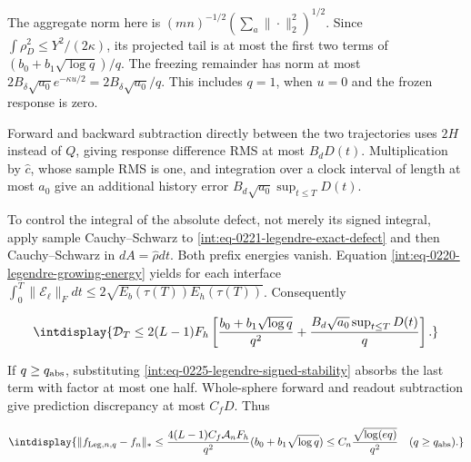 
The aggregate norm here is \((mn)^{-1/2}(\sum_a\|\cdot\|_2^2)^{1/2}\). Since \(\int\rho_D^2\le Y^2/(2\kappa)\), its projected tail is at most the first two terms of \((b_0+b_1\sqrt{\log q})/q\). The freezing remainder has norm at most \(2B_\delta\sqrt{a_0}e^{-\kappa u/2} =2B_\delta\sqrt{a_0}/q\). This includes \(q=1\), when \(u=0\) and the frozen response is zero.



Forward and backward subtraction directly between the two trajectories uses \(2H\) instead of \(Q\), giving response difference RMS at most \(B_dD(t)\). Multiplication by \(\widehat c\), whose sample RMS is one, and integration over a clock interval of length at most \(a_0\) give an additional history error \(B_d\sqrt{a_0}\sup_{t\le T}D(t)\).



To control the integral of the absolute defect, not merely its signed integral, apply sample Cauchy--Schwarz to \eqref{int:eq-0221-legendre-exact-defect} and then Cauchy--Schwarz in \(dA=\widehat\rho dt\). Both prefix energies vanish. Equation \eqref{int:eq-0220-legendre-growing-energy} yields for each interface \(\int_0^T\|\mathcal E_\ell\|_Fdt \le2\sqrt{E_b(\tau(T))E_h(\tau(T))}\). Consequently


\begingroup\renewcommand{\theHequation}{intdisplay.538}
\begin{equation}
\intdisplay{
\mathcal D_T\le2(L-1)F_h\left[
\frac{b_0+b_1\sqrt{\log q}}{q^2}
+\frac{B_d\sqrt{a_0}\sup_{t\le T}D(t)}q\right].
}
\label{int:eq-0226-legendre-absorption-inequality}
\end{equation}
\endgroup


If \(q\ge q_{\rm abs}\), substituting \eqref{int:eq-0225-legendre-signed-stability} absorbs the last term with factor at most one half. Whole-sphere forward and readout subtraction give prediction discrepancy at most \(C_fD\). Thus


\begingroup\renewcommand{\theHequation}{intdisplay.539}
\begin{equation}
\intdisplay{
\|f_{{\rm Leg},n,q}-f_n\|_*
\le\frac{4(L-1)C_f\mathcal A_nF_h}{q^2}
(b_0+b_1\sqrt{\log q})
\le C_n\frac{\sqrt{\log(eq)}}{q^2}
\quad(q\ge q_{\rm abs}).
}
\label{int:eq-0227-legendre-large-order}
\end{equation}
\endgroup

